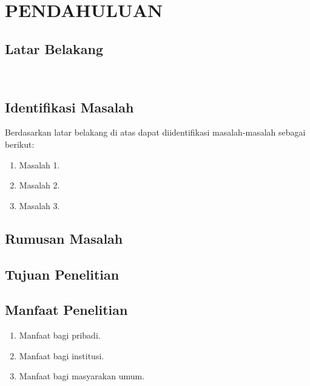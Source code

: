 \chapter{PENDAHULUAN}

\vspace{4.5pt}

\begin{flushleft}
    \section{Latar Belakang} 
    \label{sec:latar_belakang}
\begin{justify}
  
    \blindtext\\
\end{justify}
   

\end{flushleft}




\section{Identifikasi Masalah}
Berdasarkan latar belakang di atas dapat diidentifikasi masalah-masalah sebagai berikut:
\begin{enumerate}[nolistsep,leftmargin=0.5cm]
\item Masalah 1.
\item Masalah 2.
\item Masalah 3.
\end{enumerate}

\section{Rumusan Masalah}

\section{Tujuan Penelitian}

\section{Manfaat Penelitian}
\begin{enumerate}[nolistsep,leftmargin=0.5cm]
\item Manfaat bagi pribadi.
\item Manfaat bagi institusi.
\item Manfaat bagi masyarakan umum.
\end{enumerate}

